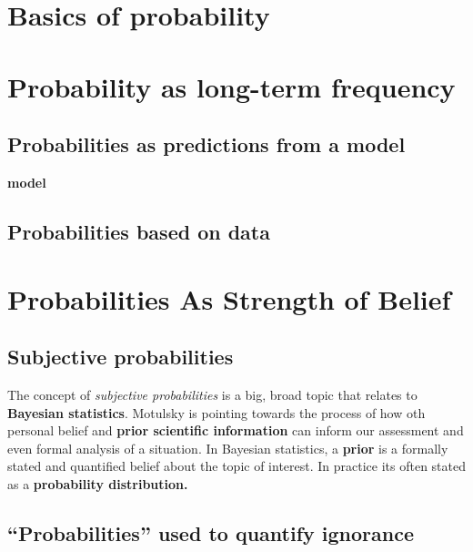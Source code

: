 \documentclass[]{book}
\theoremstyle{definition}
\theoremstyle{definition}
\theoremstyle{definition}
\theoremstyle{remark}
\begin{document}
\section{Basics of probability}\label{basics-of-probability}

\section{Probability as long-term
frequency}\label{probability-as-long-term-frequency}

\subsection{Probabilities as predictions from a
model}\label{probabilities-as-predictions-from-a-model}

\textbf{model}

\subsection{Probabilities based on
data}\label{probabilities-based-on-data}

\section{Probabilities As Strength of
Belief}\label{probabilities-as-strength-of-belief}

\subsection{Subjective probabilities}\label{subjective-probabilities}

The concept of \emph{subjective probabilities} is a big, broad topic
that relates to \textbf{Bayesian statistics}. Motulsky is pointing
towards the process of how oth personal belief and \textbf{prior
scientific information} can inform our assessment and even formal
analysis of a situation. In Bayesian statistics, a \textbf{prior} is a
formally stated and quantified belief about the topic of interest. In
practice its often stated as a \textbf{probability distribution.}

\subsection{\texorpdfstring{``Probabilities'' used to quantify
ignorance}{Probabilities used to quantify ignorance}}\label{probabilities-used-to-quantify-ignorance}
\end{document}
